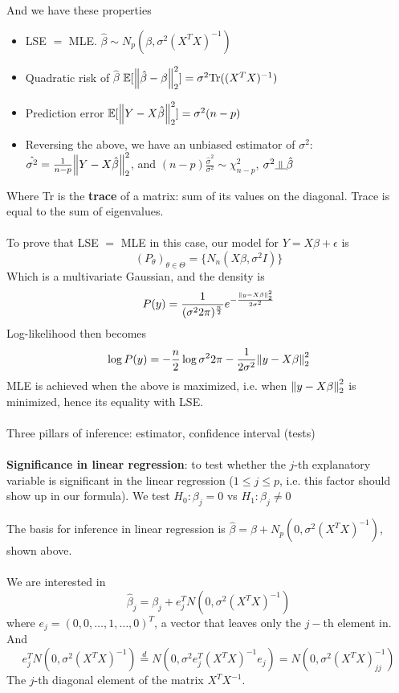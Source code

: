 \documentclass{article}
\newcommand{\indep}{\rotatebox[origin=c]{90}{$\models$}}
\begin{document}
And we have these properties
\begin{itemize}
  \item LSE $=$ MLE. $\hat{\beta} \sim \mathit{N}_p (\beta, \sigma^2 (X^T X)^{-1})$
  \item Quadratic risk of $\hat{\beta}$ $\mathbb{E}[\norm{\hat{\beta} - \beta}_2^2] = \sigma^2 \text{Tr}((X^T X)^{-1})$
  \item Prediction error $\mathbb{E}[\norm{Y - X \hat{\beta}}_2^2] = \sigma^2 (n - p)$
  \item Reversing the above, we have an unbiased estimator of $\sigma^2$: $\hat{\sigma^2} = \frac{1}{n - p} \norm{Y - X \hat{\beta}}_2^2$, and $(n - p) \frac{\hat{\sigma}^2}{\sigma^2} \sim \chi^2_{n - p}$, $\sigma^2 \indep \hat{\beta}$
\end{itemize}

Where Tr is the \textbf{trace} of a matrix: sum of its values on the diagonal.
Trace is equal to the sum of eigenvalues.
\\
\\
To prove that LSE $=$ MLE in this case, our model for $Y = X \beta + \epsilon$ is
$$
(P_{\theta})_{\theta \in \Theta} = \{\mathit{N}_n(X \beta, \sigma^2 I)\}
$$
Which is a multivariate Gaussian, and the density is
$$
P(y) = \frac{1}{(\sigma^2 2 \pi)^{\frac{n}{2}}} e^{-\frac{\norm{y - X \beta}^2_2}{2 \sigma^2}}
$$
Log-likelihood then becomes
$$
\log{P(y)} = -\frac{n}{2} \log{\sigma^2 2 \pi} - \frac{1}{2 \sigma^2} \norm{y - X \beta}^2_2
$$
MLE is achieved when the above is maximized, i.e. when $\norm{y - X \beta}^2_2$ is minimized, hence its equality with LSE.
\\
\\

Three pillars of inference: estimator, confidence interval (tests)
\\
\\
\textbf{Significance in linear regression}: to test whether the $j$-th explanatory variable is significant in the linear regression ($1 \leq j \leq p$, i.e. this factor should show up in our formula).
We test $H_0: \beta_j = 0$ vs $H_1: \beta_j \neq 0$

The basis for inference in linear regression is $\hat{\beta} = \beta + \mathit{N}_p(0, \sigma^2 (X^T X)^{-1})$, shown above.
\\
\\
We are interested in
$$
\hat{\beta}_j = \beta_j + e_j^T \mathit{N}(0, \sigma^2 (X^T X)^{-1})
$$
where $e_j = (0, 0, \dots, 1, \dots, 0)^T$, a vector that leaves only the $j-$th element in.
And 
$$
e_j^T \mathit{N}(0, \sigma^2 (X^T X)^{-1}) \overset{d}{=} \mathit{N}(0, \sigma^2 e_j^T (X^T X)^{-1} e_j) = \mathit{N}(0, \sigma^2 (X^T X)^{-1}_{jj})
$$
The $j$-th diagonal element of the matrix $X^T X^{-1}$.
\end{document}
